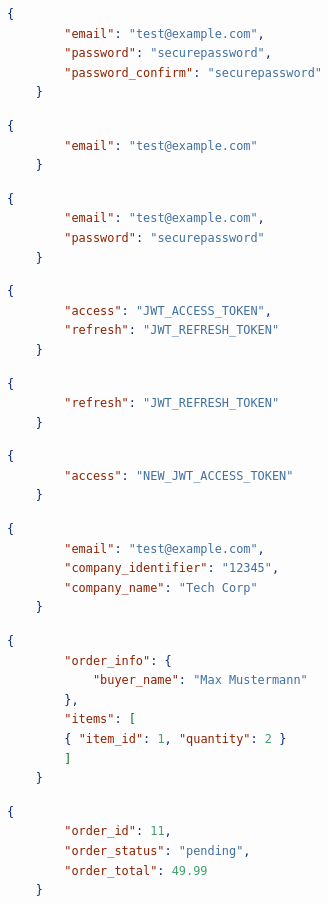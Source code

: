 \documentclass[%
	12pt,
	a4paper,
	oneside,
	parskip=full
]{scrbook}
\begin{document}
\begin{lstlisting}[language=json, caption={Request für Registrierung}, label=lst:register-request]
	{
		"email": "test@example.com",
		"password": "securepassword",
		"password_confirm": "securepassword"
	}
\end{lstlisting}

\begin{lstlisting}[language=json, caption={Response für Registrierung}, label=lst:register-response]
	{
		"email": "test@example.com"
	}
\end{lstlisting}

\begin{lstlisting}[language=json, caption={Request für Login}, label=lst:login-request]
	{
		"email": "test@example.com",
		"password": "securepassword"
	}
\end{lstlisting}

\begin{lstlisting}[language=json, caption={Response für Login}, label=lst:login-response]
	{
		"access": "JWT_ACCESS_TOKEN",
		"refresh": "JWT_REFRESH_TOKEN"
	}
\end{lstlisting}

\begin{lstlisting}[language=json, caption={Request für Token Refresh}, label=lst:refresh-request]
	{
		"refresh": "JWT_REFRESH_TOKEN"
	}
\end{lstlisting}

\begin{lstlisting}[language=json, caption={Response für Token Refresh}, label=lst:refresh-response]
	{
		"access": "NEW_JWT_ACCESS_TOKEN"
	}
\end{lstlisting}

\begin{lstlisting}[language=json, caption={Response für Profilabruf}, label=lst:profile-response]
	{
		"email": "test@example.com",
		"company_identifier": "12345",
		"company_name": "Tech Corp"
	}
\end{lstlisting}

\begin{lstlisting}[language=json, caption={Request für Bestellungen}, label=lst:order-request]
	{
		"order_info": {
			"buyer_name": "Max Mustermann"
		},
		"items": [
		{ "item_id": 1, "quantity": 2 }
		]
	}
\end{lstlisting}

\begin{lstlisting}[language=json, caption={Response für Bestellungen}, label=lst:order-response]
	{
		"order_id": 11,
		"order_status": "pending",
		"order_total": 49.99
	}
\end{lstlisting}
\end{document}
